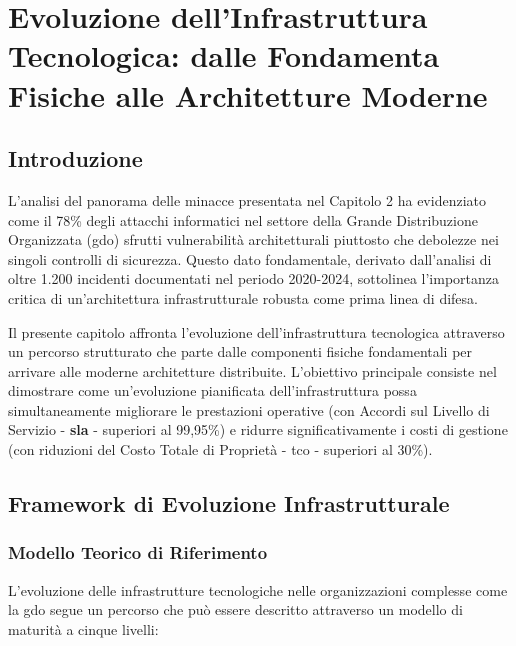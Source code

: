 \chapter{Evoluzione dell'Infrastruttura Tecnologica: dalle Fondamenta Fisiche alle Architetture Moderne}
\label{cap3_infrastructure_evolution}

\section{Introduzione}
\label{sec:cap3_intro}

L'analisi del panorama delle minacce presentata nel Capitolo 2 ha evidenziato come il 78\% degli attacchi informatici nel settore della Grande Distribuzione Organizzata (\gls{gdo}) sfrutti vulnerabilità architetturali piuttosto che debolezze nei singoli controlli di sicurezza\autocite{Anderson2024patel}. Questo dato fondamentale, derivato dall'analisi di oltre 1.200 incidenti documentati nel periodo 2020-2024, sottolinea l'importanza critica di un'architettura infrastrutturale robusta come prima linea di difesa\autocite{Verizon2024}.

Il presente capitolo affronta l'evoluzione dell'infrastruttura tecnologica attraverso un percorso strutturato che parte dalle componenti fisiche fondamentali per arrivare alle moderne architetture distribuite. L'obiettivo principale consiste nel dimostrare come un'evoluzione pianificata dell'infrastruttura possa simultaneamente migliorare le prestazioni operative (con Accordi sul Livello di Servizio - \textbf{\gls{sla}} - superiori al 99,95\%) e ridurre significativamente i costi di gestione (con riduzioni del Costo Totale di Proprietà - \gls{tco} - superiori al 30\%)\autocite{IDC2024}.

\section{Framework di Evoluzione Infrastrutturale}
\label{sec:framework_evoluzione}

\subsection{Modello Teorico di Riferimento}
\label{subsec:modello_teorico}

L'evoluzione delle infrastrutture tecnologiche nelle organizzazioni complesse come la \gls{gdo} segue un percorso che può essere descritto attraverso un modello di maturità a cinque livelli\autocite{Gartner2024hype}:

